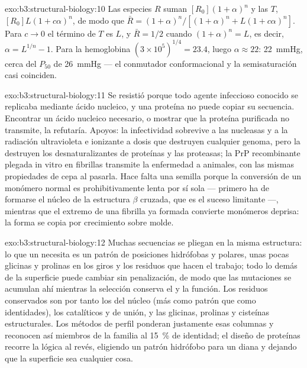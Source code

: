 \begin{solution}{exo:b3:structural-biology:10}
Las especies $R$ suman $[R_{0}](1+\alpha)^{n}$ y las $T$,
$[R_{0}]L(1+c\alpha)^{n}$, de modo que $\bar R = (1+\alpha)^{n}/[(1+\alpha)^{n}
+ L(1+c\alpha)^{n}]$. Para $c \to 0$ el término de $T$ es $L$, y $\bar R =
1/2$ cuando $(1+\alpha)^{n} = L$, es decir, $\alpha = L^{1/n} - 1$. Para
la hemoglobina $(3\times 10^{5})^{1/4} = 23.4$, luego
$\alpha \approx 22$: \qty{22}{mmHg}, cerca del $P_{50}$ de
\qty{26}{mmHg} --- el conmutador conformacional y la semisaturación casi
coinciden.
\end{solution}

\begin{solution}{exo:b3:structural-biology:11}
Se resistió porque todo agente infeccioso conocido se replicaba mediante
ácido nucleico, y una proteína no puede copiar su secuencia. Encontrar un
ácido nucleico necesario, o mostrar que la proteína purificada no
transmite, la refutaría. Apoyos: la infectividad sobrevive a las
nucleasas y a la radiación ultravioleta e ionizante a dosis que destruyen
cualquier genoma, pero la destruyen los desnaturalizantes de proteínas y
las proteasas; la PrP recombinante plegada in vitro en fibrillas
transmite la enfermedad a animales, con las mismas propiedades de cepa al
pasarla. Hace falta una semilla porque la conversión de un monómero
normal es prohibitivamente lenta por sí sola --- primero ha de formarse
el núcleo de la estructura $\beta$ cruzada, que es el suceso limitante
---, mientras que el extremo de una fibrilla ya formada convierte
monómeros deprisa: la forma se copia por crecimiento sobre molde.
\end{solution}

\begin{solution}{exo:b3:structural-biology:12}
Muchas secuencias se pliegan en la misma estructura: lo que un
 necesita es un patrón de posiciones hidrófobas y polares,
unas pocas glicinas y prolinas en los giros y los residuos que hacen el
trabajo; todo lo demás de la superficie puede cambiar sin penalización,
de modo que las mutaciones se acumulan ahí mientras la selección
conserva el  y la función. Los residuos conservados son por
tanto los del núcleo (más como patrón que como identidades), los
catalíticos y de unión, y las glicinas, prolinas y cisteínas
estructurales. Los métodos de perfil ponderan justamente esas columnas y
reconocen así miembros de la familia al \qty{15}{\%} de identidad; el
diseño de proteínas recorre la lógica al revés, eligiendo un patrón
hidrófobo para un  diana y dejando que la superficie sea
cualquier cosa.
\end{solution}

